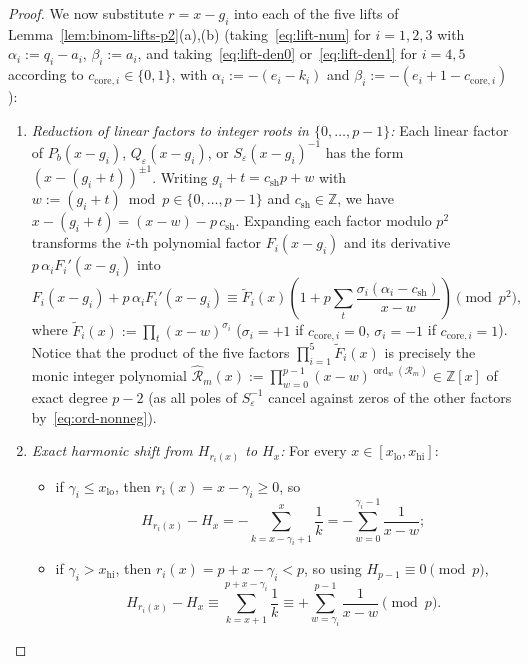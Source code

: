 \documentclass[11pt,reqno]{amsart}
\theoremstyle{definition}
\theoremstyle{remark}
\newcommand{\ZZ}{\mathbb{Z}}
\newcommand{\ord}{\operatorname{ord}}
\begin{document}
\begin{proof}
We now substitute $r = x - g_i$ into each of the five lifts of Lemma~\ref{lem:binom-lifts-p2}(a),(b) (taking~\eqref{eq:lift-num} for $i = 1, 2, 3$ with $\alpha_i := q_i - a_i$, $\beta_i := a_i$, and taking~\eqref{eq:lift-den0} or~\eqref{eq:lift-den1} for $i = 4, 5$ according to $c_{\mathrm{core}, i} \in \{0, 1\}$, with $\alpha_i := -(e_i - k_i)$ and $\beta_i := -(e_i + 1 - c_{\mathrm{core}, i})$):
\begin{enumerate}
  \item \emph{Reduction of linear factors to integer roots in $\{0, \ldots, p - 1\}$:} Each linear factor of $P_b(x - g_i)$, $Q_\varepsilon(x - g_i)$, or $S_\varepsilon(x - g_i)^{-1}$ has the form $(x - (g_i + t))^{\pm 1}$. Writing $g_i + t = c_{\mathrm{sh}} p + w$ with $w := (g_i + t) \bmod p \in \{0, \ldots, p - 1\}$ and $c_{\mathrm{sh}} \in \ZZ$, we have $x - (g_i + t) = (x - w) - p\,c_{\mathrm{sh}}$. Expanding each factor modulo $p^2$ transforms the $i$-th polynomial factor $F_i(x - g_i)$ and its derivative $p\,\alpha_i F_i'(x - g_i)$ into
  \[
    F_i(x - g_i) + p\,\alpha_i F_i'(x - g_i)
    \equiv \widetilde{F}_i(x)\left(1 + p\sum_t \frac{\sigma_i(\alpha_i - c_{\mathrm{sh}})}{x - w}\right) \pmod{p^2},
  \]
  where $\widetilde{F}_i(x) := \prod_t (x - w)^{\sigma_i}$ ($\sigma_i = +1$ if $c_{\mathrm{core},i} = 0$, $\sigma_i = -1$ if $c_{\mathrm{core},i} = 1$). Notice that the product of the five factors $\prod_{i=1}^5 \widetilde{F}_i(x)$ is precisely the monic integer polynomial $\widehat{\mathcal{R}}_m(x) := \prod_{w=0}^{p-1}(x - w)^{\ord_w(\mathcal{R}_m)} \in \ZZ[x]$ of exact degree $p - 2$ (as all poles of $S_\varepsilon^{-1}$ cancel against zeros of the other factors by~\eqref{eq:ord-nonneg}).
  \item \emph{Exact harmonic shift from $H_{r_i(x)}$ to $H_x$:} For every $x \in [x_{\mathrm{lo}}, x_{\mathrm{hi}}]$:
  \begin{itemize}
    \item if $\gamma_i \le x_{\mathrm{lo}}$, then $r_i(x) = x - \gamma_i \ge 0$, so
    \begin{equation}
    \label{eq:H-shift}
      H_{r_i(x)} - H_x = -\sum_{k = x - \gamma_i + 1}^{x} \frac{1}{k} = -\sum_{w = 0}^{\gamma_i - 1} \frac{1}{x - w};
    \end{equation}
    \item if $\gamma_i > x_{\mathrm{hi}}$, then $r_i(x) = p + x - \gamma_i < p$, so using $H_{p-1} \equiv 0 \pmod p$,
    \begin{equation}
    \label{eq:H-shift-hi}
      H_{r_i(x)} - H_x \equiv \sum_{k = x + 1}^{p + x - \gamma_i} \frac{1}{k} \equiv +\sum_{w = \gamma_i}^{p - 1} \frac{1}{x - w} \pmod p.

\end{equation}
\end{itemize}
\end{enumerate}
\end{proof}
\end{document}
